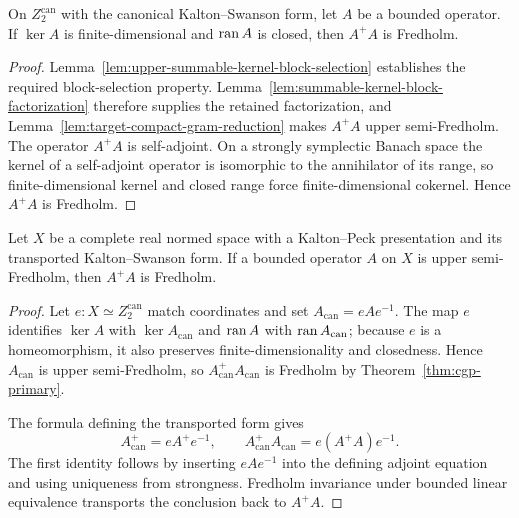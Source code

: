 \begin{theorem}\label{thm:cgp-primary}
On $Z_2^{\mathrm{can}}$ with the canonical Kalton--Swanson form, let $A$ be a bounded operator.  If
$\ker A$ is finite-dimensional and $\operatorname{ran} A$ is closed, then $A^+A$ is Fredholm.
\leanok
\end{theorem}

\begin{proof}
Lemma~\ref{lem:upper-summable-kernel-block-selection} establishes the required block-selection
property.  Lemma~\ref{lem:summable-kernel-block-factorization} therefore supplies the retained
factorization, and
Lemma~\ref{lem:target-compact-gram-reduction} makes $A^+A$ upper semi-Fredholm.
The operator $A^+A$ is self-adjoint.  On a strongly symplectic Banach space the kernel of a
self-adjoint operator is isomorphic to the annihilator of its range, so finite-dimensional
kernel and closed range force finite-dimensional cokernel.  Hence $A^+A$ is Fredholm.
\end{proof}

\begin{theorem}\label{thm:cgp-transport}
Let $X$ be a complete real normed space with a Kalton--Peck presentation and its transported
Kalton--Swanson form.  If a bounded operator $A$ on $X$ is upper semi-Fredholm, then $A^+A$ is
Fredholm.
\leanok
\end{theorem}

\begin{proof}
Let $e:X\simeq Z_2^{\mathrm{can}}$ match coordinates and set $A_{\mathrm{can}}=eAe^{-1}$.  The map
$e$ identifies $\ker A$ with $\ker A_{\mathrm{can}}$ and $\operatorname{ran} A$ with
$\operatorname{ran} A_{\mathrm{can}}$; because $e$ is a homeomorphism, it also preserves finite-dimensionality and
closedness.  Hence $A_{\mathrm{can}}$ is upper semi-Fredholm, so
$A_{\mathrm{can}}^+A_{\mathrm{can}}$ is Fredholm by Theorem~\ref{thm:cgp-primary}.

The formula defining the transported form gives
\[
  A_{\mathrm{can}}^+=eA^+e^{-1},
  \qquad
  A_{\mathrm{can}}^+A_{\mathrm{can}}=e(A^+A)e^{-1}.
\]
The first identity follows by inserting $eAe^{-1}$ into the defining adjoint equation and using
uniqueness from strongness.  Fredholm invariance under bounded linear equivalence transports the
conclusion back to $A^+A$.
\end{proof}

